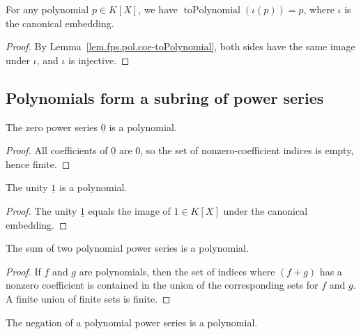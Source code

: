 \begin{lemma}
\label{lem.fps.pol.toPolynomial-coe}
\leanhelper
\leanok
For any polynomial $p\in K[X]$, we have
$\operatorname{toPolynomial}(\iota(p))=p$, where $\iota$ is the canonical embedding.
\end{lemma}

\begin{proof}
\leanok
By Lemma~\ref{lem.fps.pol.coe-toPolynomial}, both sides have the same image
under $\iota$, and $\iota$ is injective.
\end{proof}

\subsection{Polynomials form a subring of power series}

\begin{lemma}
\label{lem.fps.pol.zero}
\leanhelper
\leanok
The zero power series $\underline{0}$ is a polynomial.
\end{lemma}

\begin{proof}
\leanok
All coefficients of $\underline{0}$ are $0$, so the set of nonzero-coefficient
indices is empty, hence finite.
\end{proof}

\begin{lemma}
\label{lem.fps.pol.one}
\leanhelper
\leanok
The unity $\underline{1}$ is a polynomial.
\end{lemma}

\begin{proof}
\leanok
The unity $\underline{1}$ equals the image of $1\in K[X]$ under the canonical
embedding.
\end{proof}

\begin{lemma}
\label{lem.fps.pol.add}
\leanhelper
\leanok
The sum of two polynomial power series is a polynomial.
\end{lemma}

\begin{proof}
\leanok
If $f$ and $g$ are polynomials, then the set of indices where $(f+g)$ has a
nonzero coefficient is contained in the union of the corresponding sets for
$f$ and $g$. A finite union of finite sets is finite.
\end{proof}

\begin{lemma}
\label{lem.fps.pol.neg}
\leanhelper
\leanok
The negation of a polynomial power series is a polynomial.
\end{lemma}

